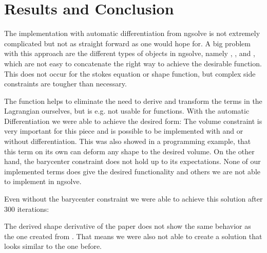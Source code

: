 \section{Results and Conclusion}
The implementation with automatic differentiation from ngsolve is not extremely complicated but not as straight forward as one would hope for. A big problem with this approach are the different types of objects in ngsolve, namely , ,  and , which are not easy to concatenate the right way to achieve the desirable function.
This does not occur for the stokes equation or shape function, but complex side constraints are tougher than necessary.

The  function helps to eliminate the need to derive and transform the terms in the Lagrangian ourselves, but is e.g. not usable for  functions. 
With the automatic Differentiation we were able to achieve the desired form:
The volume constraint is very important for this piece and is possible to be implemented with and or without differentiation. This was also showed in a programming example, that this term on its own can deform any shape to the desired volume.
On the other hand, the barycenter constraint does not hold up to its expectations. None of our implemented terms does give the desired functionality and others we are not able to implement in ngsolve.

Even without the barycenter constraint we were able to achieve this solution after 300 iterations:


The derived shape derivative of the paper \cite{nearly_conformal_paper} does not show the same behavior as the one created from . That means we were also not able to create a solution that looks similar to the one before.
